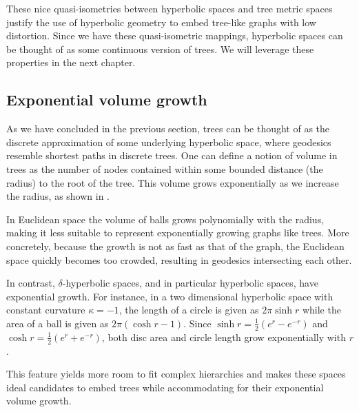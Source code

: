 These nice quasi-isometries between hyperbolic spaces and tree metric spaces justify the use of hyperbolic geometry to embed tree-like graphs with low distortion. Since we have these quasi-isometric mappings, hyperbolic spaces can be thought of as some continuous version of trees. We will leverage these properties in the next chapter. 

\subsection{Exponential volume growth}\label{sec:expGrowth}
As we have concluded in the previous section, trees can be thought of as the discrete approximation of some underlying hyperbolic space, where geodesics resemble shortest paths in discrete trees. One can define a notion of volume in trees as the number of nodes contained within some bounded distance (the radius) to the root of the tree. This volume grows exponentially as we increase the radius, as shown in .



In Euclidean space the volume of balls grows polynomially with the radius, making it less suitable to represent exponentially growing graphs like trees. More concretely, because the growth is not as fast as that of the graph, the Euclidean space quickly becomes too crowded, resulting in geodesics intersecting each other.

In contrast, $\delta$-hyperbolic spaces, and in particular hyperbolic spaces, have exponential growth. For instance, in a two dimensional hyperbolic space with constant curvature $\kappa = -1$, the length of a circle is given as $2\pi \sinh r$ while the area of a ball is given as $2\pi(\cosh r - 1)$. Since $\sinh r = \frac{1}{2} (e^r - e^{-r})$ and $\cosh r = \frac{1}{2} (e^r + e^{-r})$, both disc area and circle length grow exponentially with $r$. 

This feature yields more room to fit complex hierarchies and makes these spaces ideal candidates to embed trees while accommodating for their exponential volume growth. 